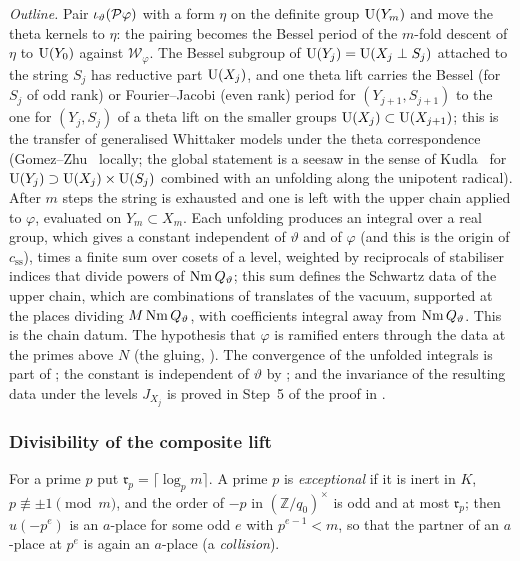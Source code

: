 \documentclass[10pt]{amsart}
\theoremstyle{definition}
\theoremstyle{remark}
\newcommand{\Z}{\mathbb Z}
\begin{document}
\noindent\emph{Outline.} Pair $\iota_\vartheta(\mathcal P\varphi)$ with a form $\eta$ on the definite
group $\mathrm U(Y_m)$ and move the theta kernels to $\eta$: the pairing becomes the Bessel period of
the $m$-fold descent of $\eta$ to $\mathrm U(Y_0)$ against $\mathcal W_\varphi$. The Bessel subgroup of
$\mathrm U(Y_j)=\mathrm U(X_j\perp S_j)$ attached to the string $S_j$ has reductive part $\mathrm U(X_j)$, and one
theta lift carries the Bessel (for $S_j$ of odd rank) or Fourier--Jacobi (even rank) period for
$(Y_{j+1},S_{j+1})$ to the one for $(Y_j,S_j)$ of a theta lift on the smaller groups
$\mathrm U(X_j)\subset\mathrm U(X_{j+1})$; this is the transfer of generalised Whittaker models under the
theta correspondence (Gomez--Zhu~\cite{GomezZhu} locally; the global statement is a seesaw in the
sense of Kudla~\cite{KudlaSeesaw} for $\mathrm U(Y_j)\supset\mathrm U(X_j)\times\mathrm U(S_j)$ combined with an
unfolding along the unipotent radical). After $m$ steps the string is exhausted and one is left
with the upper chain applied to $\varphi$, evaluated on $Y_m\subset X_m$. Each unfolding produces
an integral over a real group, which gives a constant independent of $\vartheta$ and of
$\varphi$ (and this is the origin of $c_{\mathrm{ss}}$), times a finite sum over cosets of a
level, weighted by reciprocals of stabiliser indices that divide powers of $\operatorname{Nm} Q_\vartheta$;
this sum defines the Schwartz data of the upper chain, which are combinations of translates of the
vacuum, supported at the places dividing $M\operatorname{Nm} Q_\vartheta$, with coefficients integral away
from $\operatorname{Nm} Q_\vartheta$. This is the chain datum. The hypothesis that $\varphi$ is ramified
enters through the data at the primes above $N$ (the gluing, {\cite[\S5.1.6]{P49}}). The
convergence of the unfolded integrals is part of {\cite[Proposition~5.9]{P49}}; the constant is
independent of $\vartheta$ by {\cite[Lemmas~5.10 and~5.13]{P49}}; and the invariance of the
resulting data under the levels $J_{X_j}$ is proved in Step~5 of the proof in {\cite[\S5.1.7]{P49}}.

\subsubsection*{Divisibility of the composite lift}

For a prime $p$ put $\mathfrak r_p=\lceil\log_pm\rceil$. A prime $p$ is \emph{exceptional} if it
is inert in $K$, $p\not\equiv\pm1\pmod m$, and the order of $-p$ in $(\Z/q_0)^\times$ is odd and
at most $\mathfrak r_p$; then $u(-p^e)$ is an $a$-place for some odd $e$ with $p^{e-1}<m$, so
that the partner of an $a$-place at $p^e$ is again an $a$-place (a \emph{collision}).
\end{document}
